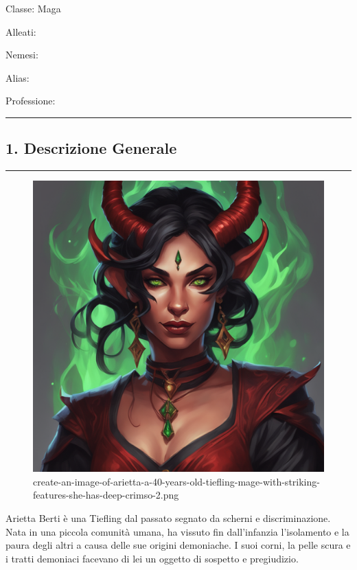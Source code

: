 Classe: Maga

Alleati:

Nemesi:

Alias:

Professione:

\begin{center}\rule{0.5\linewidth}{0.5pt}\end{center}

\subsection{1. Descrizione Generale}\label{descrizione-generale}

\begin{center}\rule{0.5\linewidth}{0.5pt}\end{center}

\begin{figure}
\centering
\includegraphics{create-an-image-of-arietta-a-40-years-old-tiefling-mage-with-striking-features-she-has-deep-crimso-2.png}
\caption{create-an-image-of-arietta-a-40-years-old-tiefling-mage-with-striking-features-she-has-deep-crimso-2.png}
\end{figure}

Arietta Berti è una Tiefling dal passato segnato da scherni e
discriminazione. Nata in una piccola comunità umana, ha vissuto fin
dall'infanzia l'isolamento e la paura degli altri a causa delle sue
origini demoniache. I suoi corni, la pelle scura e i tratti demoniaci
facevano di lei un oggetto di sospetto e pregiudizio.

